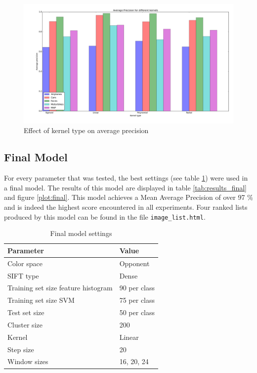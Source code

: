 \begin{figure}[H]
\includegraphics[width=\textwidth]{../plots/kernels}
\caption{Effect of kernel type on average precision}
\label{plot:kernels}
\end{figure}


\subsection{Final Model}
For every parameter that was tested, the best settings (see table \ref{tab:final}) were used in a final model. The results of this model are displayed in table \ref{tab:results_final} and figure \ref{plot:final}. This model achieves a Mean Average Precision of over 97 \% and is indeed the highest score encountered in all experiments. Four ranked lists produced by this model can be found in the file \verb|image_list.html|.
 
\begin{table}[H]
\begin{tabular}{|l|l|}
\hline
\textbf{Parameter} & \textbf{Value}\\
\hline
Color space & Opponent\\
SIFT type & Dense\\
Training set size feature histogram & 90 per class\\
Training set size SVM & 75 per class\\
Test set size & 50 per class \\
Cluster size & 200 \\
Kernel & Linear \\
Step size & 20\\
Window sizes & 16, 20, 24\\
\hline
\end{tabular}
\caption{Final model settings}
\label{tab:final}
\end{table}

